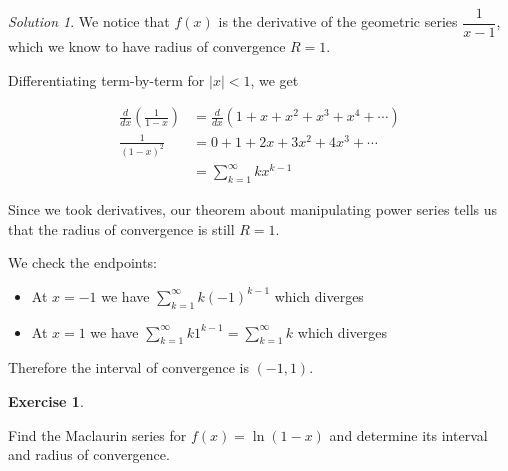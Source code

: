 \documentclass[
]{book}
\providecommand{\tightlist}{%
  \setlength{\itemsep}{0pt}\setlength{\parskip}{0pt}}
\theoremstyle{definition}
\theoremstyle{definition}
\theoremstyle{definition}
\newtheorem{exercise}{Exercise}[chapter]
\theoremstyle{definition}
\theoremstyle{remark}
\newtheorem*{solution}{Solution}
\begin{document}
\begin{solution}

We notice that \(f(x)\) is the derivative of the geometric series \(\dfrac{1}{x-1}\), which we know to have radius of convergence \(R=1\).

Differentiating term-by-term for \(|x|<1\), we get

\begin{align*}
\frac{d}{dx}\left (\frac{1}{1-x} \right) &= \frac{d}{dx} (1+x+x^2+x^3+x^4+\cdots)\\
\frac{1}{(1-x)^2}&=0+1+2x+3x^2+4x^3+\cdots\\
&=\sum_{k=1}^\infty kx^{k-1}
\end{align*}

Since we took derivatives, our theorem about manipulating power series tells us that the radius of convergence is still \(R=1\).

We check the endpoints:

\begin{itemize}
\tightlist
\item
  At \(x=-1\) we have \(\sum_{k=1}^\infty k(-1)^{k-1}\) which diverges
\item
  At \(x=1\) we have \(\sum_{k=1}^\infty k 1^{k-1} =\sum_{k=1}^\infty k\) which diverges
\end{itemize}

Therefore the interval of convergence is \((-1,1)\).

\end{solution}

\begin{exercise}
\protect\hypertarget{exr:unlabeled-div-248}{}\label{exr:unlabeled-div-248}

Find the Maclaurin series for \(f(x)=\ln(1-x)\) and determine its interval and radius of convergence.

\end{exercise}
\end{document}
